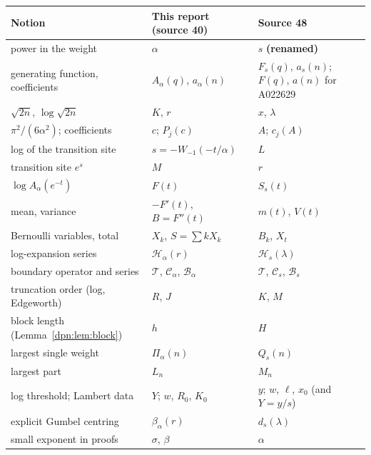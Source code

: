 \documentclass[11pt]{article}
\numberwithin{equation}{section}
\theoremstyle{definition}\newtheorem{definition}[theorem]{Definition}
\theoremstyle{remark}\newtheorem{remark}[theorem]{Remark}
\newcommand{\asym}{\mathscr H_{\alpha}}
\newcommand{\Cop}{\mathcal C_\alpha}
\newcommand{\Bop}{\mathcal B_\alpha}
\newcommand{\Top}{\mathcal T}
\begin{document}
\begin{center}
\small
\begin{tabular}{>{\raggedright\arraybackslash}p{4.4cm}>{\raggedright\arraybackslash}p{4.3cm}>{\raggedright\arraybackslash}p{5.0cm}}
\toprule
Notion & This report (source 40) & Source 48\\
\midrule
power in the weight & $\alpha$ & $s$ \textbf{(renamed)}\\
generating function, coefficients & $A_\alpha(q)$, $a_\alpha(n)$ & $F_s(q)$, $a_s(n)$; $F(q)$, $a(n)$ for A022629\\
$\sqrt{2n}$, $\log\sqrt{2n}$ & $K$, $r$ & $x$, $\lambda$\\
$\pi^2/(6\alpha^2)$; coefficients & $c$; $P_j(c)$ & $A$; $c_j(A)$\\
log of the transition site & $s=-W_{-1}(-t/\alpha)$ & $L$\\
transition site $e^s$ & $M$ & $r$\\
$\log A_\alpha(e^{-t})$ & $F(t)$ & $S_s(t)$\\
mean, variance & $-F'(t)$, $B=F''(t)$ & $m(t)$, $V(t)$\\
Bernoulli variables, total & $X_k$, $S=\sum kX_k$ & $B_k$, $X_t$\\
log-expansion series & $\asym(r)$ & $\mathcal H_s(\lambda)$\\
boundary operator and series & $\Top$, $\Cop$, $\Bop$ & $\mathcal T$, $\mathcal C_s$, $\mathcal B_s$\\
truncation order (log, Edgeworth) & $R$, $J$ & $K$, $M$\\
block length (Lemma~\ref{dpn:lem:block}) & $h$ & $H$\\
largest single weight & $\Pi_\alpha(n)$ & $Q_s(n)$\\
largest part & $L_n$ & $M_n$\\
log threshold; Lambert data & $Y$; $w$, $R_0$, $K_0$ & $y$; $w$, $\ell$, $x_0$ (and $Y=y/s$)\\
explicit Gumbel centring & $\beta_\alpha(r)$ & $d_s(\lambda)$\\
small exponent in proofs & $\sigma$, $\beta$ & $\alpha$\\
\bottomrule
\end{tabular}
\end{center}
\end{document}
